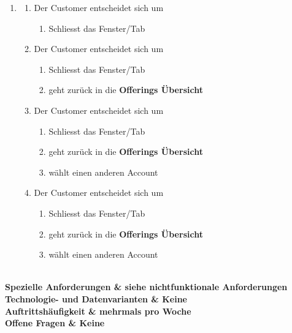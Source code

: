 \documentclass[11pt]{scrartcl}
\begin{document}
\begin{longtabu}
\begin{enumerate}
		  \item 
                 \begin{enumerate}
		    \item Der Customer entscheidet sich um
		    \begin{enumerate}
		      \item Schliesst das Fenster/Tab
		    \end{enumerate}
		    \item  Der Customer entscheidet sich um
		     \begin{enumerate}
		      \item Schliesst das Fenster/Tab
		      \item geht zurück in die \textbf{Offerings Übersicht}
		    \end{enumerate}
		    
		       \item  Der Customer entscheidet sich um
		     \begin{enumerate}
		      \item Schliesst das Fenster/Tab
		      \item geht zurück in die \textbf{Offerings Übersicht}
		      \item wählt einen anderen Account
		    \end{enumerate}
		    
		    
		     \item  Der Customer entscheidet sich um
		     \begin{enumerate}
		      \item Schliesst das Fenster/Tab
		      \item geht zurück in die \textbf{Offerings Übersicht}
		      \item wählt einen anderen Account
		    \end{enumerate}
		    
		  \end{enumerate}
			
		\end{enumerate}
	 \\\hline
	\bfseries Spezielle Anforderungen & siehe nichtfunktionale Anforderungen  \\\hline 
	\bfseries Technologie- und Datenvarianten & Keine  \\\hline 
	\bfseries Auftrittshäufigkeit & mehrmals pro Woche  \\\hline 
	\bfseries Offene Fragen & Keine  \\\hline  
\end{longtabu}
\newpage
\end{document}
